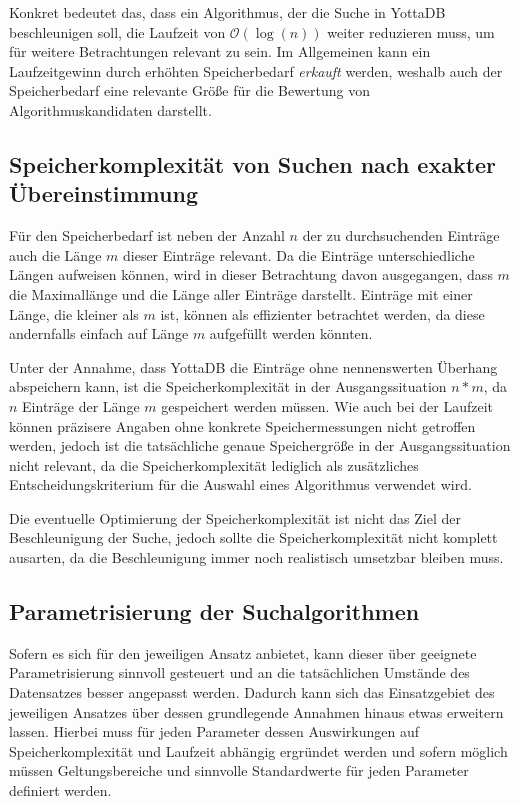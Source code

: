 \documentclass[oneside]{ausarbeitung}
\begin{document}
Konkret bedeutet das, dass ein Algorithmus, der die Suche in YottaDB beschleunigen soll, die Laufzeit von $\mathcal{O}(\log(n))$ weiter reduzieren muss, um für weitere Betrachtungen relevant zu sein. Im Allgemeinen kann ein Laufzeitgewinn durch erhöhten Speicherbedarf \textit{erkauft} werden, weshalb auch der Speicherbedarf eine relevante Größe für die Bewertung von Algorithmuskandidaten darstellt.
	
	
	
\subsection{Speicherkomplexität von Suchen nach exakter Übereinstimmung}
	
Für den Speicherbedarf ist neben der Anzahl $n$ der zu durchsuchenden Einträge auch die Länge $m$ dieser Einträge relevant. Da die Einträge unterschiedliche Längen aufweisen können, wird in dieser Betrachtung davon ausgegangen, dass $m$ die Maximallänge und die Länge aller Einträge darstellt. Einträge mit einer Länge, die kleiner als $m$ ist, können als effizienter betrachtet werden, da diese andernfalls einfach auf Länge $m$ aufgefüllt werden könnten.
	
Unter der Annahme, dass YottaDB die Einträge ohne nennenswerten Überhang abspeichern kann, ist die Speicherkomplexität in der Ausgangssituation $n*m$, da $n$ Einträge der Länge $m$ gespeichert werden müssen. Wie auch bei der Laufzeit können präzisere Angaben ohne konkrete Speichermessungen nicht getroffen werden, jedoch ist die tatsächliche genaue Speichergröße in der Ausgangssituation nicht relevant, da die Speicherkomplexität lediglich als zusätzliches Entscheidungskriterium für die Auswahl eines Algorithmus verwendet wird.
	
Die eventuelle Optimierung der Speicherkomplexität ist nicht das Ziel der Beschleunigung der Suche, jedoch sollte die Speicherkomplexität nicht komplett ausarten, da die Beschleunigung immer noch realistisch umsetzbar bleiben muss.
	
	
	
\subsection{Parametrisierung der Suchalgorithmen}
	
Sofern es sich für den jeweiligen Ansatz anbietet, kann dieser über geeignete Parametrisierung sinnvoll gesteuert und an die tatsächlichen Umstände des Datensatzes besser angepasst werden. Dadurch kann sich das Einsatzgebiet des jeweiligen Ansatzes über dessen grundlegende Annahmen hinaus etwas erweitern lassen. Hierbei muss für jeden Parameter dessen Auswirkungen auf Speicherkomplexität und Laufzeit abhängig ergründet werden und sofern möglich müssen Geltungsbereiche und sinnvolle Standardwerte für jeden Parameter definiert werden.
	
\end{document}
